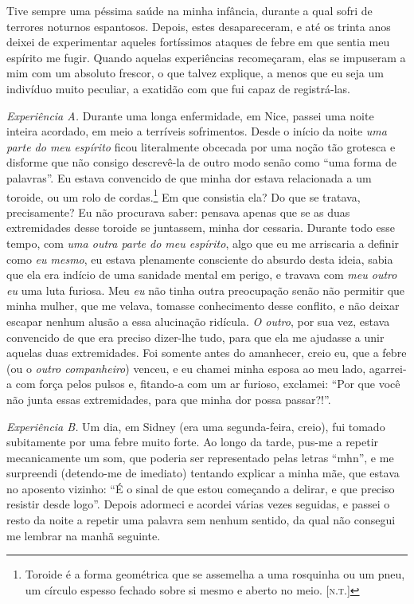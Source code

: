 Tive sempre uma péssima saúde na minha infância, durante a qual sofri de
terrores noturnos espantosos.  Depois, estes desapareceram, e até os
trinta anos deixei de experimentar aqueles fortíssimos ataques de febre
em que sentia meu espírito me fugir.  Quando aquelas experiências
recomeçaram, elas se impuseram a mim com um absoluto frescor, o que
talvez explique, a menos que eu seja um indivíduo muito peculiar, a
exatidão com que fui capaz de registrá-las. 

\textit{Experiência A.}  Durante uma longa enfermidade, em Nice, passei
uma noite inteira acordado, em meio a terríveis sofrimentos.  Desde o
início da noite \textit{uma parte do meu espírito} ficou literalmente
obcecada por uma noção tão grotesca e disforme que não consigo
descrevê-la de outro modo senão como “uma forma de palavras”.  Eu
estava convencido de que minha dor estava relacionada a um toroide, ou
um rolo de cordas.\footnote{ Toroide é a forma geométrica
que se assemelha a uma rosquinha ou um pneu, um círculo
espesso fechado sobre si mesmo e aberto no meio. [\textsc{n.t.}]}  Em que consistia
ela? Do que se tratava, precisamente?  Eu não procurava saber: pensava
apenas que se as duas extremidades desse toroide se juntassem, minha
dor cessaria.  Durante todo esse tempo, com \textit{uma outra parte do
meu espírito}, algo que eu me arriscaria a definir como \textit{eu
mesmo}, eu estava plenamente consciente do absurdo desta ideia, sabia
que ela era indício de uma sanidade mental em perigo, e travava com
\textit{meu outro eu} uma luta furiosa.  Meu \textit{eu} não tinha
outra preocupação senão não permitir que minha mulher, que me velava,
tomasse conhecimento desse conflito, e não deixar escapar nenhum alusão
a essa alucinação ridícula.  \textit{O outro}, por sua vez, estava
convencido de que era preciso dizer-lhe tudo, para que ela me ajudasse
a unir aquelas duas extremidades.  Foi somente antes do amanhecer,
creio eu, que a febre (ou o \textit{outro companheiro}) venceu, e eu
chamei minha esposa ao meu lado, agarrei-a com força pelos pulsos e,
fitando-a com um ar furioso, exclamei: “Por que você não junta essas
extremidades, para que minha dor possa passar?!”.

\textit{Experiência B.}  Um dia, em Sidney (era uma segunda-feira,
creio), fui tomado subitamente por uma febre muito forte.  Ao longo da
tarde, pus-me a repetir mecanicamente um som, que poderia ser
representado pelas letras “mhn”, e me surpreendi (detendo-me de
imediato) tentando explicar a minha mãe, que estava no aposento
vizinho: “É o sinal de que estou começando a delirar, e que preciso
resistir desde logo”.  Depois adormeci e acordei várias vezes seguidas,
e passei o resto da noite a repetir uma palavra sem nenhum sentido, da
qual não consegui me lembrar na manhã seguinte.

